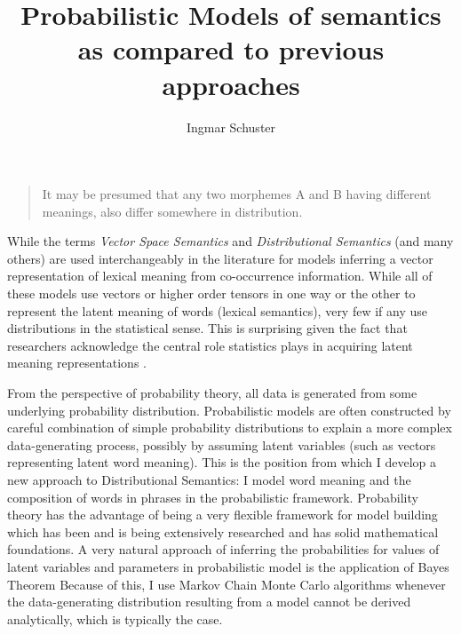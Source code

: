 \documentclass[11pt]{article}
\title{Probabilistic Models of semantics as compared to previous approaches}
\author{Ingmar Schuster}
\begin{document}
\maketitle

 \begin{quote}
It may be presumed that any two morphemes A and B having different meanings, also differ somewhere in distribution. \emph{}
\end{quote}

While the terms \emph{Vector Space Semantics} and \emph{Distributional Semantics} (and many others) are used interchangeably in the literature for models inferring a vector representation of lexical meaning from co-occurrence information. While all  of these models use vectors or higher order tensors in one way or the other to represent the latent meaning of words (lexical semantics), very few if any use distributions in the statistical sense. This is surprising given the fact that researchers acknowledge the central role statistics plays in acquiring latent meaning representations \cite{Lenci2008}.

From the perspective of probability theory, all data is generated from some underlying probability distribution. Probabilistic models are often constructed by careful combination of simple probability distributions to explain a more complex data-generating process, possibly by assuming latent variables (such as vectors representing latent word meaning). This is the position from which I develop a new approach to Distributional Semantics: I model word meaning and the composition of words in phrases in the probabilistic framework. Probability theory has the advantage of being a very flexible framework for model building which has been and is being extensively researched and has solid mathematical foundations. A very natural approach of inferring the probabilities for values of latent variables and parameters in probabilistic model is the application of Bayes Theorem Because of this, I use Markov Chain Monte Carlo algorithms whenever the data-generating distribution resulting from a model cannot be derived analytically, which is typically the case.
\end{document}
